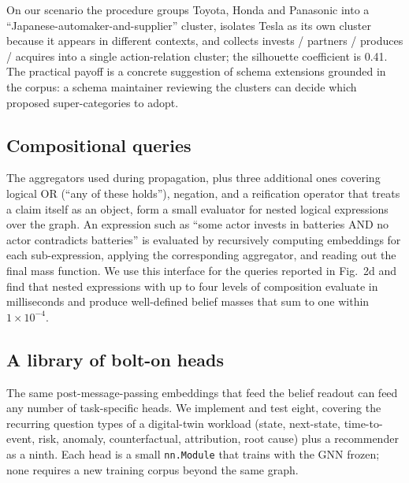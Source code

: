 \documentclass[11pt,a4paper]{article}
\begin{document}
On our scenario the procedure groups Toyota, Honda and
Panasonic into a ``Japanese-automaker-and-supplier'' cluster,
isolates Tesla as its own cluster because it appears in
different contexts, and collects invests / partners / produces
/ acquires into a single action-relation cluster; the
silhouette coefficient is 0.41. The practical payoff is a
concrete suggestion of schema extensions grounded in the
corpus: a schema maintainer reviewing the clusters can decide
which proposed super-categories to adopt.

\subsection{Compositional queries}

The aggregators used during propagation, plus three additional
ones covering logical OR (``any of these holds''), negation,
and a reification operator that treats a claim itself as an
object, form a small evaluator for nested logical expressions
over the graph. An expression such as ``some actor invests in
batteries AND no actor contradicts batteries'' is evaluated by
recursively computing embeddings for each sub-expression,
applying the corresponding aggregator, and reading out the
final mass function. We use this interface for the queries
reported in Fig.~2d and find that nested expressions with up
to four levels of composition evaluate in milliseconds and
produce well-defined belief masses that sum to one within
$1 \times 10^{-4}$.

\subsection{A library of bolt-on heads}

The same post-message-passing embeddings that feed the belief
readout can feed any number of task-specific heads. We implement
and test eight, covering the recurring question types of a
digital-twin workload (state, next-state, time-to-event, risk,
anomaly, counterfactual, attribution, root cause) plus a
recommender as a ninth. Each head is a small \texttt{nn.Module}
that trains with the GNN frozen; none requires a new training
corpus beyond the same graph.
\end{document}
